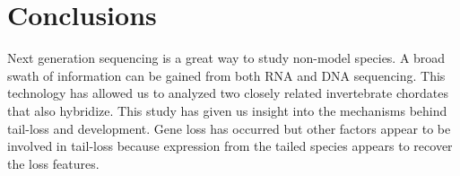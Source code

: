 \chapter{Conclusions}
Next generation sequencing is a great way to study non-model species. A broad swath of information can be gained from both RNA and DNA sequencing. This technology has allowed us to analyzed two closely related invertebrate chordates that also hybridize. This study has given us insight into the mechanisms behind tail-loss and development. Gene loss has occurred but other factors appear to be involved in tail-loss because expression from the tailed species appears to recover the loss features. 
